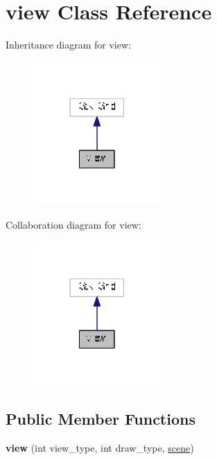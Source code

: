 \hypertarget{classview}{}\section{view Class Reference}
\label{classview}


Inheritance diagram for view\+:\nopagebreak
\begin{figure}[H]
\begin{center}
\leavevmode
\includegraphics[width=138pt]{classview__inherit__graph}
\end{center}
\end{figure}


Collaboration diagram for view\+:\nopagebreak
\begin{figure}[H]
\begin{center}
\leavevmode
\includegraphics[width=138pt]{classview__coll__graph}
\end{center}
\end{figure}
\subsection*{Public Member Functions}
\begin{DoxyCompactItemize}
\item 
\mbox{\label{classview_a8119e8f79d6433430a2e3c3240d41dfc}} 
{\bfseries view} (int view\+\_\+type, int draw\+\_\+type, \hyperlink{classscene}{scene})
\end{DoxyCompactItemize}
